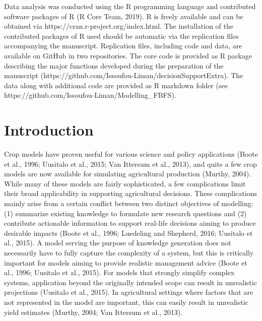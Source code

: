 \documentclass[]{elsarticle} %
\begin{document}
Data analysis was conducted using the R programming language and contributed software packages of R (R Core Team, 2019). R is freely available and can be obtained via https://cran.r-project.org/index.html. The installation of the contributed packages of R used should be automatic via the replication files accompanying the manuscript. Replication files, including code and data, are available on GitHub in two repositories. The core code is provided as R package describing the major functions developed during the preparation of the manuscript (https://github.com/Issoufou-Liman/decisionSupportExtra). The data along with additional code are provided as R markdown folder (see https://github.com/Issoufou-Liman/Modelling\_FBFS).

\hypertarget{ref1}{%
\section{Introduction}\label{ref1}}

Crop models have proven useful for various science and policy applications (Boote et al., 1996; Uusitalo et al., 2015; Van Ittersum et al., 2013), and quite a few crop models are now available for simulating agricultural production (Murthy, 2004). While many of these models are fairly sophisticated, a few complications limit their broad applicability in supporting agricultural decisions. These complications mainly arise from a certain conflict between two distinct objectives of modelling: (1) summarize existing knowledge to formulate new research questions and (2) contribute actionable information to support real-life decisions aiming to produce desirable impacts (Boote et al., 1996; Luedeling and Shepherd, 2016; Uusitalo et al., 2015). A model serving the purpose of knowledge generation does not necessarily have to fully capture the complexity of a system, but this is critically important for models aiming to provide realistic management advice (Boote et al., 1996; Uusitalo et al., 2015). For models that strongly simplify complex systems, application beyond the originally intended scope can result in unrealistic projections (Uusitalo et al., 2015). In agricultural settings where factors that are not represented in the model are important, this can easily result in unrealistic yield estimates (Murthy, 2004; Van Ittersum et al., 2013).
\end{document}
